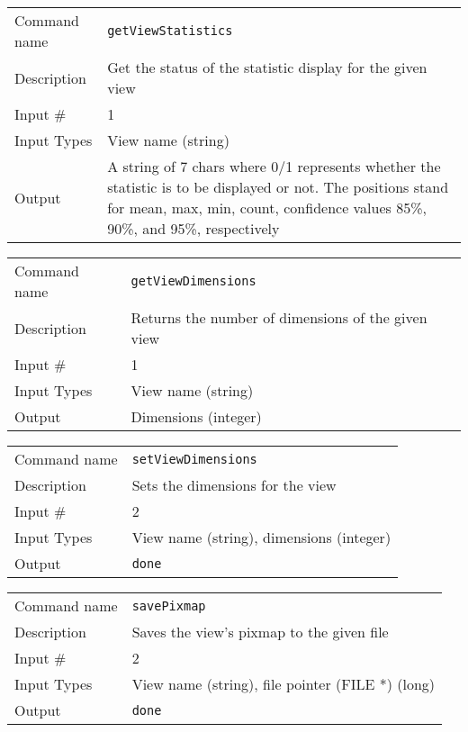 \bigskip

\noindent
\begin{tabular}{l|p{5in}}
\hline
Command name & {\tt getViewStatistics} \\
Description  & Get the status of the statistic display for the given view \\
Input \#     & 1 \\
Input Types  & View name (string) \\
Output       & A string of 7 chars where 0/1 represents whether the
               statistic is to be displayed or not. The positions stand for
               mean, max, min, count, confidence values 85\%, 90\%, and 95\%,
               respectively \\
\hline
\end{tabular}

\bigskip

\noindent
\begin{tabular}{l|p{5in}}
\hline
Command name & {\tt getViewDimensions} \\
Description  & Returns the number of dimensions of the given view \\
Input \#     & 1 \\
Input Types  & View name (string) \\
Output       & Dimensions (integer) \\
\hline
\end{tabular}

\bigskip

\noindent
\begin{tabular}{l|p{5in}}
\hline
Command name & {\tt setViewDimensions} \\
Description  & Sets the dimensions for the view \\
Input \#     & 2 \\
Input Types  & View name (string), dimensions (integer) \\
Output       & {\tt done} \\
\hline
\end{tabular}

\bigskip

\noindent
\begin{tabular}{l|p{5in}}
\hline
Command name & {\tt savePixmap} \\
Description  & Saves the view's pixmap to the given file \\
Input \#     & 2 \\
Input Types  & View name (string), file pointer (FILE *) (long) \\
Output       & {\tt done} \\
\hline
\end{tabular}


